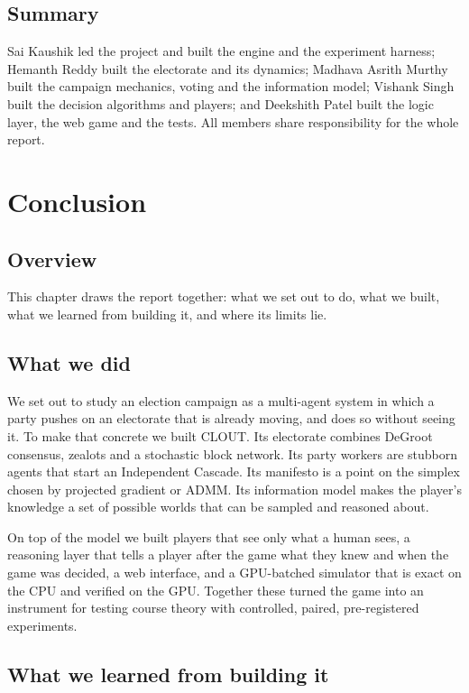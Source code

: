 \documentclass[11pt,a4paper,oneside]{report}
\newcommand{\overviewsection}{\section{Overview}}
\newcommand{\summarysection}{\section{Summary}}
\begin{document}
\summarysection

Sai Kaushik led the project and built the engine and the experiment harness; Hemanth Reddy built the
electorate and its dynamics; Madhava Asrith Murthy built the campaign mechanics, voting and the
information model; Vishank Singh built the decision algorithms and players; and Deekshith Patel built the
logic layer, the web game and the tests. All members share responsibility for the whole report.

\chapter{Conclusion}\label{ch:conclusion}

\overviewsection

This chapter draws the report together: what we set out to do, what we built, what we learned from
building it, and where its limits lie.

\section{What we did}

We set out to study an election campaign as a multi-agent system in which a party pushes on an electorate
that is already moving, and does so without seeing it. To make that concrete we built CLOUT. Its
electorate combines DeGroot consensus, zealots and a stochastic block network. Its party workers are
stubborn agents that start an Independent Cascade. Its manifesto is a point on the simplex chosen by
projected gradient or ADMM. Its information model makes the player's knowledge a set of possible worlds
that can be sampled and reasoned about.

On top of the model we built players that see only what a human sees, a reasoning layer that tells a
player after the game what they knew and when the game was decided, a web interface, and a GPU-batched
simulator that is exact on the CPU and verified on the GPU. Together these turned the game into an
instrument for testing course theory with controlled, paired, pre-registered experiments.

\section{What we learned from building it}
\end{document}
